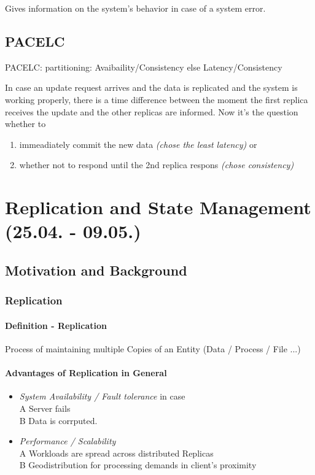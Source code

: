 \documentclass[a4paper,12pt]{article}%
\begin{document}
Gives information on the system's behavior in case of a system error.

\subsection{PACELC}
PACELC: partitioning: Avaibaility/Consistency else Latency/Consistency

In case an update request arrives and the data is replicated and the system is working properly,
there is a time difference between the moment the first replica receives the update and the other replicas are informed.
Now it's the question whether to 
\begin{enumerate}
 \item immeadiately commit the new data {\it (chose the least latency)} or 
 \item whether not to respond until the 2nd replica respons {\it (chose consistency)} 
\end{enumerate}




\newpage
 
 \section{Replication and State Management\\ (25.04. - 09.05.)}


\subsection{Motivation and Background}

\subsubsection{Replication}
\paragraph{Definition - Replication}
Process of maintaining multiple Copies of an Entity (Data / Process / File ...)

\paragraph{Advantages of Replication in General}
\begin{itemize}
	\item {\it System Availability / Fault tolerance} in case \\
	A \quad Server fails \\
	B \quad Data is corrputed.
	\item {\it Performance / Scalability } \\
	A \quad Workloads are spread across distributed Replicas \\
	B \quad Geodistribution for processing demands in client's proximity
\end{itemize} 
\end{document}
